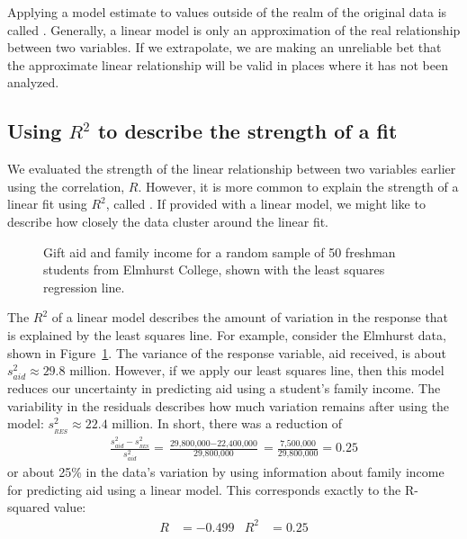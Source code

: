 Applying a model estimate to values outside of the realm of the
original data is called .
Generally, a linear model is only an approximation of the real
relationship between two variables.
If we extrapolate, we are making an unreliable bet that the
approximate linear relationship will be valid in places where
it has not been analyzed.



\subsection{Using $R^2$ to describe the strength of a fit}


We evaluated the strength of the linear relationship between
two variables earlier using the correlation, $R$.
However, it is more common to explain the strength of a linear
fit using $R^2$, called
.
If provided with a linear model, we might like to describe how
closely the data cluster around the linear fit.

\begin{figure}[h]
  \centering
  \caption{Gift aid and family income for a random sample
      of 50 freshman students from Elmhurst College, shown
      with the least squares regression line.}
  \label{elmhurstScatterWLSROnly}
\end{figure}

\newcommand{\mil}[0]{\text{ million}}
The $R^2$ of a linear model describes the amount of variation
in the response that is explained by the least squares line.
For example, consider the Elmhurst data,
shown in Figure~\ref{elmhurstScatterWLSROnly}.
The variance of the response variable, aid received,
is about $s_{aid}^2 \approx 29.8$ million.
However, if we apply our least squares line, then this model
reduces our uncertainty in predicting aid using a student's
family income.
The variability in the residuals describes how much variation
remains after using the model: $s_{_{RES}}^2 \approx 22.4$ million.
In short, there was a reduction of
\begin{align*}
\frac{s_{aid}^2 - s_{_{RES}}^2}{s_{aid}^2}
  = \frac{\text{29,800,000} - \text{22,400,000}}
      {\text{29,800,000}}
  = \frac{\text{7,500,000}}{\text{29,800,000}}
  = 0.25
\end{align*}
or about  25\% in the data's variation by using information
about family income for predicting aid using a linear model.
This corresponds exactly to the R-squared value:
\begin{align*}
R &= -0.499 &R^2 &= 0.25
\end{align*}

